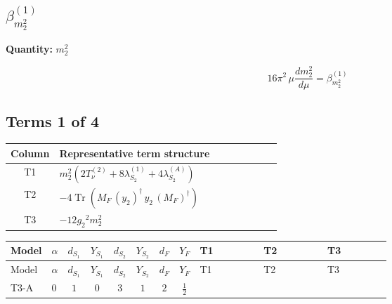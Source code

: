 \documentclass[8pt]{article}
\begin{document}
\begin{landscape}
\section*{$\beta_{m_2^2}^{(1)}$}
\noindent\textbf{Quantity: }$m_2^2$\par\smallskip
\[16\pi^2\,\mu\frac{d m_2^2}{d\mu}=\beta_{m_2^2}^{(1)}\]
\subsection*{Terms 1 of 4}
\begin{center}
\begin{tabular}{@{}c >{\raggedright\arraybackslash}p{0.82\linewidth}@{}}
\toprule
Column & Representative term structure \\
\midrule
T1 & \(\displaystyle {m_2^2} (2 T_{\nu}^{(2)}+8 {\lambda_{S_2}^{(1)}}+4 {\lambda_{S_2}^{(A)}})\) \\
\midrule
T2 & \(\displaystyle -4 \operatorname{Tr}\!\left({M_F}\,\left({y_2}\right)^{\dagger}\,{y_2}\,\left({M_F}\right)^{\dagger}\right)\) \\
\midrule
T3 & \(\displaystyle -12 {g_2}^2 {m_2^2}\) \\
\midrule
\bottomrule
\end{tabular}
\end{center}
\smallskip
\tiny
\begin{longtable}{@{}llcccccc >{\raggedright\arraybackslash}p{0.21\linewidth} >{\raggedright\arraybackslash}p{0.21\linewidth} >{\raggedright\arraybackslash}p{0.21\linewidth}@{}}
\toprule
Model & $\alpha$ & $d_{S_1}$ & $Y_{S_1}$ & $d_{S_2}$ & $Y_{S_2}$ & $d_F$ & $Y_F$ & T1 & T2 & T3 \\
\midrule
\endfirsthead
\toprule
Model & $\alpha$ & $d_{S_1}$ & $Y_{S_1}$ & $d_{S_2}$ & $Y_{S_2}$ & $d_F$ & $Y_F$ & T1 & T2 & T3 \\
\midrule
\endhead
T3-A & $0$ & $1$ & $0$ & $3$ & $1$ & $2$ & $\frac{1}{2}$ & \scriptsize\adjustbox{max width=\linewidth}{$\begin{gathered} {m_2^2} (2 T_{\nu}^{(2)}+8 {\lambda_{S_2}^{(1)}}+4 {\lambda_{S_2}^{(A)}})\end{gathered}$} & \scriptsize\adjustbox{max width=\linewidth}{$\begin{gathered} -4 \operatorname{Tr}\!\left({M_F}\,\left({y_2}\right)^{\dagger}\,{y_2}\,\left({M_F}\right)^{\dagger}\right)\end{gathered}$} & \scriptsize\adjustbox{max width=\linewidth}{$\begin{gathered} -12 {g_2}^2 {m_2^2}\end{gathered}$} \\

\end{longtable}
\end{landscape}
\end{document}
